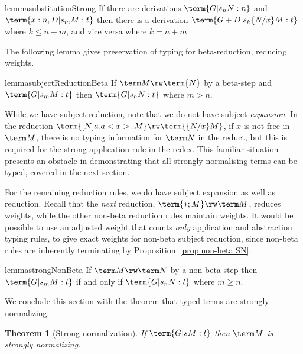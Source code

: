\documentclass[10pt,a4paper]{amsart}
\newtheorem{theorem}{Theorem}
\begin{document}
\begin{restatable}{lemma}{substitutionStrong}
\label{lem:strong substitution}
If there are derivations $\term{G |s_n N:n}$ and $\term{x:n , D |s_m M:t}$ then there is a derivation $\term{G+D |s_k \{N/x\}M :t}$ where $k\leq n+m$, and vice versa where $k=n+m$.
\end{restatable}


The following lemma gives preservation of typing for beta-reduction, reducing weights.


\begin{restatable}{lemma}{subjectReductionBeta}
\label{lem:beta subject reduction}
If $\term M\rw\term{N}$ by a beta-step and $\term{G |s_m M:t}$ then $\term{G |s_n N:t}$ where $m>n$.
\end{restatable}


While we have subject reduction, note that we do not have subject \emph{expansion}. In the reduction $\term{[N]a.a<x>.M}\rw\term{\{N/x\}M}$, if $x$ is not free in $\term M$, there is no typing information for $\term N$ in the reduct, but this is required for the strong application rule in the redex. This familiar situation presents an obstacle in demonstrating that all strongly normalising terms can be typed, covered in the next section.

For the remaining reduction rules, we do have subject expansion as well as reduction. Recall that the \emph{next} reduction, $\term{*;M}\rw\term M$, reduces weights, while the other non-beta reduction rules maintain weights. It would be possible to use an adjusted weight that counts \emph{only} application and abstraction typing rules, to give exact weights for non-beta subject reduction, since non-beta rules are inherently terminating by Proposition~\ref{prop:non-beta SN}.

\begin{restatable}{lemma}{strongNonBeta}
\label{lem:non-beta subject reduction}
If $\term M\rw\term N$ by a non-beta-step then $\term{G |s_m M:t}$ if and only if $\term{G |s_n N:t}$ where $m\geq n$.
\end{restatable}

We conclude this section with the theorem that typed terms are strongly normalizing.

\begin{theorem}[Strong normalization]
\label{thm:SN}
If $\term{G |s M:t}$ then $\term M$ is strongly normalizing.
\end{theorem}
\end{document}
